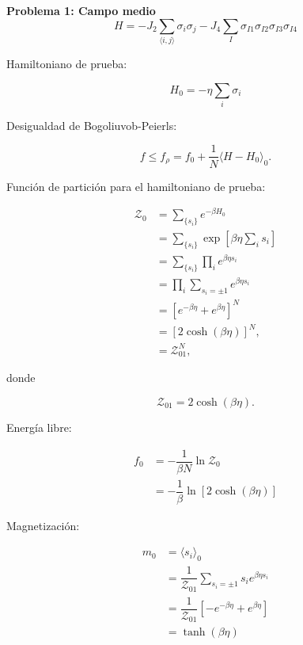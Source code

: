 \documentclass[10pt]{article}
\begin{document}
\textbf{Problema 1: Campo medio}
\\

\begin{equation}
H = -J_2 \sum_{\langle i,j\rangle} \sigma_i \sigma_j - J_4 \sum_I \sigma_{I1}\sigma_{I2}\sigma_{I3}\sigma_{I4}
\end{equation}

Hamiltoniano de prueba:

\begin{equation}
H_0 = -\eta \sum_i \sigma_i
\end{equation}

Desigualdad de Bogoliuvob-Peierls:

\begin{equation}
f \leq f_{\rho} = f_0 + \dfrac{1}{N} \langle H - H_0 \rangle_0.
\end{equation}

Funci\'on de partici\'on para el hamiltoniano de prueba:

\begin{align}
\mathcal{Z}_0 &= \sum_{\lbrace s_i\rbrace} e^{-\beta H_0} \nonumber \\
&= \sum_{\lbrace s_i\rbrace} \exp \left[ \beta \eta \sum_i s_i  \right] \nonumber \\
&= \sum_{\lbrace s_i\rbrace} \prod_i  e^{\beta \eta s_i} \nonumber \\
&= \prod_i \sum_{s_i=\pm1} e^{\beta \eta s_i}  \nonumber \\
&= \left[ e^{-\beta \eta} + e^{\beta \eta} \right]^N \nonumber \\
&= \left[ 2 \cosh\left(\beta \eta\right) \right]^N, \nonumber \\
&= \mathcal{Z}_{01}^N,
\end{align}

donde 

\begin{equation}
\mathcal{Z}_{01} = 2 \cosh\left(\beta \eta\right).
\end{equation}

Energ\'ia libre:

\begin{align}
f_0 &= -\dfrac{1}{\beta N} \ln \mathcal{Z}_0 \nonumber \\
&= -\dfrac{1}{\beta} \ln \left[ 2 \cosh\left(\beta \eta\right) \right]
\end{align}

Magnetizaci\'on:

\begin{align} \label{eq:BC_m0}
m_0 &= \langle s_i \rangle_0 \nonumber \\
&= \dfrac{1}{\mathcal{Z}_{01}} \sum_{s_i=\pm1} s_i e^{\beta \eta s_i} \nonumber \\
&= \dfrac{1}{\mathcal{Z}_{01}} \left[-e^{-\beta \eta} + e^{\beta \eta} \right] \nonumber \\
&= \tanh\left( \beta \eta \right)
\end{align}
\end{document}
